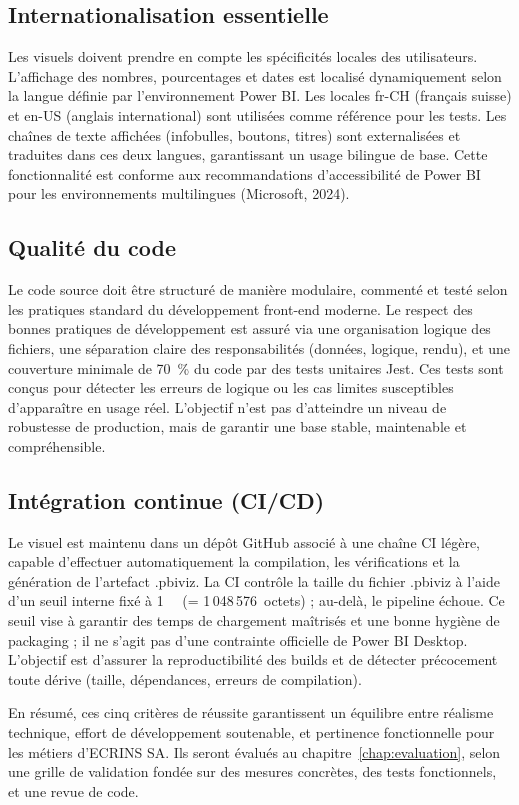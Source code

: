 \subsection{Internationalisation essentielle}  
Les visuels doivent prendre en compte les spécificités locales des utilisateurs. L’affichage des nombres, pourcentages et dates est localisé dynamiquement selon la langue définie par l’environnement Power BI. Les locales fr-CH (français suisse) et en-US (anglais international) sont utilisées comme référence pour les tests. Les chaînes de texte affichées (infobulles, boutons, titres) sont externalisées et traduites dans ces deux langues, garantissant un usage bilingue de base. Cette fonctionnalité est conforme aux recommandations d’accessibilité de Power BI pour les environnements multilingues (Microsoft, 2024).

\subsection{Qualité du code}  
Le code source doit être structuré de manière modulaire, commenté et testé selon les pratiques standard du développement front-end moderne. Le respect des bonnes pratiques de développement est assuré via une organisation logique des fichiers, une séparation claire des responsabilités (données, logique, rendu), et une couverture minimale de 70~\% du code par des tests unitaires Jest. Ces tests sont conçus pour détecter les erreurs de logique ou les cas limites susceptibles d’apparaître en usage réel. L’objectif n’est pas d’atteindre un niveau de robustesse de production, mais de garantir une base stable, maintenable et compréhensible.

\subsection{Intégration continue (CI/CD)}
Le visuel est maintenu dans un dépôt GitHub associé à une chaîne CI légère, capable d’effectuer automatiquement la compilation, les vérifications et la génération de l’artefact .pbiviz. La CI contrôle la taille du fichier .pbiviz à l’aide d’un seuil interne fixé à \SI{1}{\mebi\byte} (= 1\,048\,576~octets) ; au-delà, le pipeline échoue. Ce seuil vise à garantir des temps de chargement maîtrisés et une bonne hygiène de packaging ; il ne s’agit pas d’une contrainte officielle de Power BI Desktop. L’objectif est d’assurer la reproductibilité des builds et de détecter précocement toute dérive (taille, dépendances, erreurs de compilation).

En résumé, ces cinq critères de réussite garantissent un équilibre entre réalisme technique, effort de développement soutenable, et pertinence fonctionnelle pour les métiers d’ECRINS SA. Ils seront évalués au chapitre~\ref{chap:evaluation}, selon une grille de validation fondée sur des mesures concrètes, des tests fonctionnels, et une revue de code.
